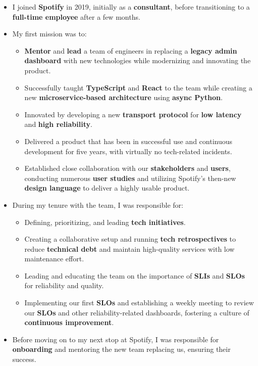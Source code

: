 \begin{itemize}
    \item I joined \textbf{Spotify} in 2019, initially as a \textbf{consultant}, before transitioning to a \textbf{full-time employee} after a few months.
    \item My first mission was to:
    \begin{itemize}
        \item \textbf{Mentor} and \textbf{lead} a team of engineers in replacing a \textbf{legacy admin dashboard} with new technologies while modernizing and innovating the product.
        \item Successfully taught \textbf{TypeScript} and \textbf{React} to the team while creating a new \textbf{microservice-based architecture} using \textbf{async Python}.
        \item Innovated by developing a new \textbf{transport protocol} for \textbf{low latency} and \textbf{high reliability}.
        \item Delivered a product that has been in successful use and continuous development for five years, with virtually no tech-related incidents.
        \item Established close collaboration with our \textbf{stakeholders} and \textbf{users}, conducting numerous \textbf{user studies} and utilizing Spotify's then-new \textbf{design language} to deliver a highly usable product.
    \end{itemize}

    \item During my tenure with the team, I was responsible for:
    \begin{itemize}
        \item Defining, prioritizing, and leading \textbf{tech initiatives}.
        \item Creating a collaborative setup and running \textbf{tech retrospectives} to reduce \textbf{technical debt} and maintain high-quality services with low maintenance effort.
        \item Leading and educating the team on the importance of \textbf{SLIs} and \textbf{SLOs} for reliability and quality.
        \item Implementing our first \textbf{SLOs} and establishing a weekly meeting to review our \textbf{SLOs} and other reliability-related dashboards, fostering a culture of \textbf{continuous improvement}.
    \end{itemize}
    \item Before moving on to my next stop at Spotify, I was responsible for \textbf{onboarding} and mentoring the new team replacing us, ensuring their success.
\end{itemize}

